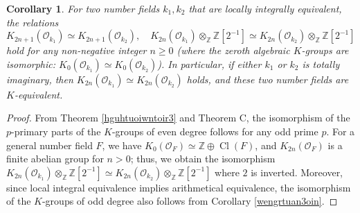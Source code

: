\documentclass{article}
\numberwithin{equation}{section} %
\newtheorem{cor}[lemm]{Corollary}
\begin{document}
\begin{cor}
\label{nr4githto4wtio4at}
  For two number fields $k_1, k_2$ that are locally integrally equivalent, the relations
  \[
    K_{2n+1}(\mathcal{O}_{k_1}) \simeq K_{2n+1}(\mathcal{O}_{k_2}), \quad K_{2n}(\mathcal{O}_{k_1}) \otimes_{\mathbb{Z}} \mathbb{Z}[2^{-1}] \simeq K_{2n}(\mathcal{O}_{k_2}) \otimes_{\mathbb{Z}} \mathbb{Z}[2^{-1}]
  \]
  hold for any non-negative integer $n \geq 0$ (where the zeroth algebraic $K$-groups are isomorphic: $K_0(\mathcal{O}_{k_1}) \simeq K_0(\mathcal{O}_{k_2})$). In particular, if either $k_1$ or $k_2$ is totally imaginary, then $K_{2n}(\mathcal{O}_{k_1}) \simeq K_{2n}(\mathcal{O}_{k_2})$ holds, and these two number fields are $K$-equivalent.
\end{cor}

\begin{proof}
  From Theorem \ref{hguhtuoiwntoir3} and Theorem C, the isomorphism of the $p$-primary parts of the $K$-groups of even degree follows for any odd prime $p$. For a general number field $F$, we have $K_0(\mathcal{O}_F) \simeq \mathbb{Z} \oplus \operatorname{Cl}(F)$, and $K_{2n}(\mathcal{O}_F)$ is a finite abelian group for $n > 0$; thus, we obtain the isomorphism $K_{2n}(\mathcal{O}_{k_1}) \otimes_{\mathbb{Z}} \mathbb{Z}[2^{-1}] \simeq K_{2n}(\mathcal{O}_{k_2}) \otimes_{\mathbb{Z}} \mathbb{Z}[2^{-1}]$ where $2$ is inverted. Moreover, since local integral equivalence implies arithmetical equivalence, the isomorphism of the $K$-groups of odd degree also follows from Corollary \ref{wengrtuan3oin}.
\end{proof}
\end{document}

